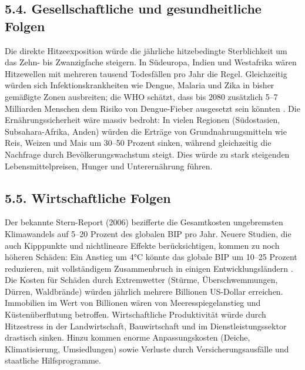 \documentclass[12pt, a4paper]{article}
\begin{document}
	\subsection*{5.4. Gesellschaftliche und gesundheitliche Folgen}
	Die direkte Hitzeexposition würde die jährliche hitzebedingte Sterblichkeit um das
	Zehn- bis Zwanzigfache steigern. In Südeuropa, Indien und Westafrika wären Hitzewellen mit
	mehreren tausend Todesfällen pro Jahr die Regel. Gleichzeitig würden sich Infektionskrankheiten
	wie Dengue, Malaria und Zika in bisher gemäßigte Zonen ausbreiten; die WHO schätzt, dass
	bis 2080 zusätzlich 5–7 Milliarden Menschen dem Risiko von Dengue-Fieber ausgesetzt sein
	könnten \cite{lancet2025}. Die Ernährungssicherheit wäre massiv bedroht: In vielen
	Regionen (Südostasien, Subsahara-Afrika, Anden) würden die Erträge von Grundnahrungsmitteln
	wie Reis, Weizen und Mais um 30–50 Prozent sinken, während gleichzeitig die Nachfrage durch
	Bevölkerungswachstum steigt. Dies würde zu stark steigenden Lebensmittelpreisen, Hunger
	und Unterernährung führen.
	
	\subsection*{5.5. Wirtschaftliche Folgen}
	Der bekannte Stern-Report (2006) bezifferte die Gesamtkosten ungebremsten Klimawandels auf
	5–20 Prozent des globalen BIP pro Jahr. Neuere Studien, die auch Kipppunkte und nichtlineare
	Effekte berücksichtigen, kommen zu noch höheren Schäden: Ein Anstieg um 4°C könnte das
	globale BIP um 10–25 Prozent reduzieren, mit vollständigem Zusammenbruch in einigen
	Entwicklungsländern \cite{worldbank2012}. Die Kosten für Schäden durch Extremwetter (Stürme,
	Überschwemmungen, Dürren, Waldbrände) würden jährlich mehrere Billionen US-Dollar erreichen.
	Immobilien im Wert von Billionen wären von Meeresspiegelanstieg und Küstenüberflutung
	betroffen. Wirtschaftliche Produktivität würde durch Hitzestress in der Landwirtschaft,
	Bauwirtschaft und im Dienstleistungssektor drastisch sinken. Hinzu kommen enorme
	Anpassungskosten (Deiche, Klimatisierung, Umsiedlungen) sowie Verluste durch
	Versicherungsausfälle und staatliche Hilfsprogramme.
	
\end{document}
